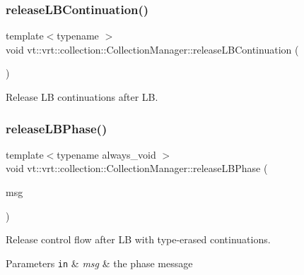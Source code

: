 \subsubsection{\texorpdfstring{release\+L\+B\+Continuation()}{releaseLBContinuation()}}
{\footnotesize\ttfamily template$<$typename $>$ \\
void vt\+::vrt\+::collection\+::\+Collection\+Manager\+::release\+L\+B\+Continuation (\begin{DoxyParamCaption}{ }\end{DoxyParamCaption})}



Release LB continuations after LB. 

\mbox{\label{structvt_1_1vrt_1_1collection_1_1_collection_manager_a3d09a3058dd6984aeff47c89b6d571b3}} 
\subsubsection{\texorpdfstring{release\+L\+B\+Phase()}{releaseLBPhase()}}
{\footnotesize\ttfamily template$<$typename always\+\_\+void $>$ \\
void vt\+::vrt\+::collection\+::\+Collection\+Manager\+::release\+L\+B\+Phase (\begin{DoxyParamCaption}\item[{\hyperlink{structvt_1_1vrt_1_1collection_1_1_collection_phase_msg}{Collection\+Phase\+Msg} $\ast$}]{msg }\end{DoxyParamCaption})\hspace{0.3cm}{\ttfamily [static]}}



Release control flow after LB with type-\/erased continuations. 


\begin{DoxyParams}[1]{Parameters}
\mbox{\tt in}  & {\em msg} & the phase message \\
\hline
\end{DoxyParams}
\mbox{\label{structvt_1_1vrt_1_1collection_1_1_collection_manager_af93d07828954a649201ef3fe463bf530}} 
